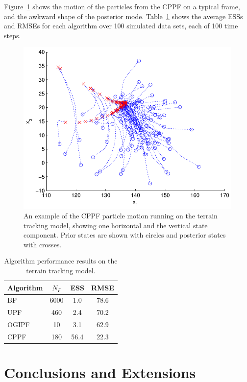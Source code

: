 \documentclass[conference]{IEEEtran}
\begin{document}
Figure~\ref{fig:drone_example_frame} shows the motion of the particles from the CPPF on a typical frame, and the awkward shape of the posterior mode. Table~\ref{tab:drone_results_gaussian} shows the average ESSs and RMSEs for each algorithm over 100 simulated data sets, each of 100 time steps.
%
\begin{figure}
\centering
\includegraphics[width=0.7\columnwidth]{drone_example_frame_deter.pdf}
\caption{An example of the CPPF particle motion running on the terrain tracking model, showing one horizontal and the vertical state component. Prior states are shown with circles and posterior states with crosses.}
\label{fig:drone_example_frame}
\end{figure}
%
\begin{table}
\renewcommand{\arraystretch}{1.3}
\centering
\caption{Algorithm performance results on the terrain tracking model.}
\begin{tabular}{l||c|c|c}
Algorithm                                & $N_F$ & ESS  & RMSE \\
\hline
BF                                       &  6000 &  1.0 & 78.6 \\
UPF                                      &   460 &  2.4 & 70.2 \\
OGIPF                                    &    10 &  3.1 & 62.9 \\
CPPF                                     &   180 & 56.4 & 22.3 \\
\end{tabular}
\label{tab:drone_results_gaussian}
\end{table}



\section{Conclusions and Extensions}
\end{document}
